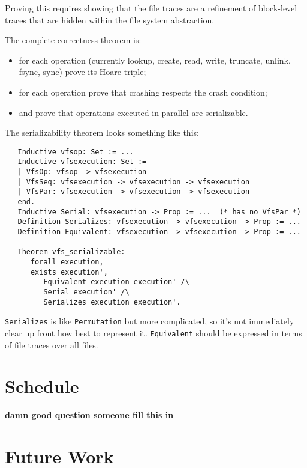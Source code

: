 \documentclass[11pt, twocolumn, letterpaper]{article}
\newcommand{\XXX}[1]{{\bf\color{red} #1}}
\begin{document}
Proving this requires showing that the file traces are a refinement of
block-level traces that are hidden within the file system abstraction.

The complete correctness theorem is:
\begin{itemize}
\item for each operation (currently lookup, create, read, write,
truncate, unlink, fsync, sync) prove its Hoare triple;
\item for each operation prove that crashing respects the crash
condition;
\item and prove that operations executed in parallel are serializable.
\end{itemize}

The serializability theorem looks something like this:
\begin{verbatim}
   Inductive vfsop: Set := ...
   Inductive vfsexecution: Set :=
   | VfsOp: vfsop -> vfsexecution
   | VfsSeq: vfsexecution -> vfsexecution -> vfsexecution
   | VfsPar: vfsexecution -> vfsexecution -> vfsexecution
   end.
   Inductive Serial: vfsexecution -> Prop := ...  (* has no VfsPar *)
   Definition Serializes: vfsexecution -> vfsexecution -> Prop := ...
   Definition Equivalent: vfsexecution -> vfsexecution -> Prop := ...

   Theorem vfs_serializable:
      forall execution,
      exists execution',
         Equivalent execution execution' /\
         Serial execution' /\
         Serializes execution execution'.
\end{verbatim}

\texttt{Serializes} is like \texttt{Permutation} but more complicated,
so it's not immediately clear up front how best to represent it.
\texttt{Equivalent} should be expressed in terms of file traces over
all files.

\section{Schedule}

%

\XXX{damn good question someone fill this in}

\section{Future Work}
\end{document}
